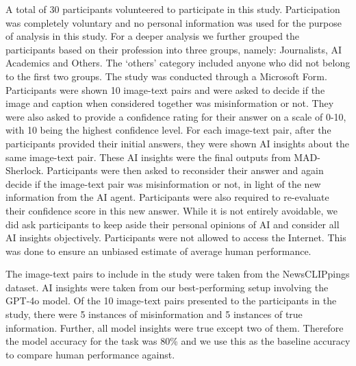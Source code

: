 \documentclass{article}
\theoremstyle{plain}
\theoremstyle{definition}
\theoremstyle{remark}
\newcommand{\frameworkname}{MAD-Sherlock}
\begin{document}
A total of 30 participants volunteered to participate in this study. Participation was completely voluntary and no personal information was used for the purpose of analysis in this study. For a deeper analysis we further grouped the participants based on their profession into three groups, namely: Journalists, AI Academics and Others. The `others' category included anyone who did not belong to the first two groups. The study was conducted through a Microsoft Form. Participants were shown 10 image-text pairs and were asked to decide if the image and caption when considered together was misinformation or not. They were also asked to provide a confidence rating for their answer on a scale of 0-10, with 10 being the highest confidence level. For each image-text pair, after the participants provided their initial answers, they were shown AI insights about the same image-text pair. These AI insights were the final outputs from \frameworkname{}. Participants were then asked to reconsider their answer and again decide if the image-text pair was misinformation or not, in light of the new information from the AI agent. Participants were also required to re-evaluate their confidence score in this new answer. While it is not entirely avoidable, we did ask participants to keep aside their personal opinions of AI and consider all AI insights objectively. Participants were not allowed to access the Internet. This was done to ensure an unbiased estimate of average human performance. 

The image-text pairs to include in the study were taken from the NewsCLIPpings \citep{luo2021newsclippings} dataset. AI insights were taken from our best-performing setup involving the GPT-4o model. Of the 10 image-text pairs presented to the participants in the study, there were 5 instances of misinformation and 5 instances of true information. Further, all model insights were true except two of them. Therefore the model accuracy for the task was 80\% and we use this as the baseline accuracy to compare human performance against.

\end{document}
